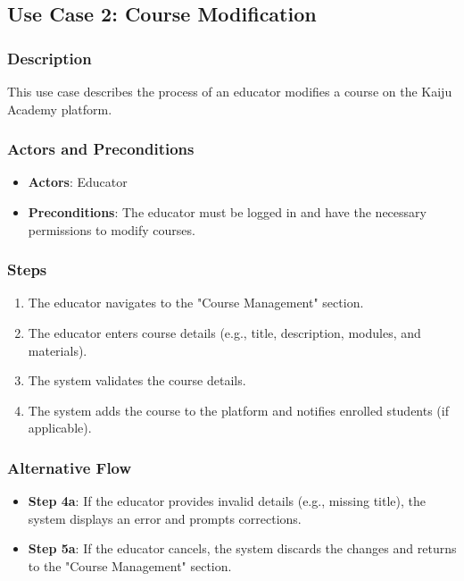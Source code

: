 \documentclass[a4paper, 11pt]{scrreprt}
\begin{document}
\subsection{Use Case 2: Course Modification}
\subsubsection{Description}
This use case describes the process of an educator modifies a course on the Kaiju Academy platform.

\subsubsection{Actors and Preconditions}
\begin{itemize}
    \item \textbf{Actors}: Educator
    \item \textbf{Preconditions}: The educator must be logged in and have the necessary permissions to modify courses.
\end{itemize}

\subsubsection{Steps}
\begin{enumerate}
    \item The educator navigates to the "Course Management" section.
    \item The educator enters course details (e.g., title, description, modules, and materials).
    \item The system validates the course details.
    \item The system adds the course to the platform and notifies enrolled students (if applicable).
\end{enumerate}

\subsubsection{Alternative Flow}
\begin{itemize}
    \item \textbf{Step 4a}: If the educator provides invalid details (e.g., missing title), the system displays an error and prompts corrections.
    \item \textbf{Step 5a}: If the educator cancels, the system discards the changes and returns to the "Course Management" section.
\end{itemize}
\end{document}
